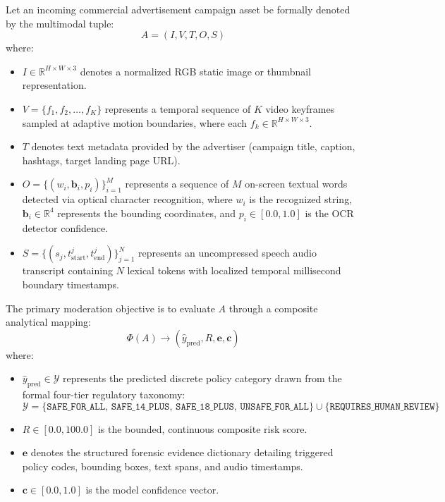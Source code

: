 \documentclass[12pt,a4paper]{report}
\begin{document}
Let an incoming commercial advertisement campaign asset be formally denoted by the multimodal tuple:
\begin{equation}
A = \left( I, V, T, O, S \right)
\end{equation}
where:
\begin{itemize}
    \item $I \in \mathbb{R}^{H \times W \times 3}$ denotes a normalized RGB static image or thumbnail representation.
    \item $V = \{f_1, f_2, \dots, f_K\}$ represents a temporal sequence of $K$ video keyframes sampled at adaptive motion boundaries, where each $f_k \in \mathbb{R}^{H \times W \times 3}$.
    \item $T$ denotes text metadata provided by the advertiser (campaign title, caption, hashtags, target landing page URL).
    \item $O = \{(w_i, \mathbf{b}_i, p_i)\}_{i=1}^M$ represents a sequence of $M$ on-screen textual words detected via optical character recognition, where $w_i$ is the recognized string, $\mathbf{b}_i \in \mathbb{R}^4$ represents the bounding coordinates, and $p_i \in [0.0, 1.0]$ is the OCR detector confidence.
    \item $S = \{(s_j, t_{\text{start}}^j, t_{\text{end}}^j)\}_{j=1}^N$ represents an uncompressed speech audio transcript containing $N$ lexical tokens with localized temporal millisecond boundary timestamps.
\end{itemize}

The primary moderation objective is to evaluate $A$ through a composite analytical mapping:
\begin{equation}
\Phi(A) \longrightarrow \left( \hat{y}_{\text{pred}}, R, \mathbf{e}, \mathbf{c} \right)
\end{equation}
where:
\begin{itemize}
    \item $\hat{y}_{\text{pred}} \in \mathcal{Y}$ represents the predicted discrete policy category drawn from the formal four-tier regulatory taxonomy:
    \begin{equation}
    \mathcal{Y} = \{\texttt{SAFE\_FOR\_ALL},\, \texttt{SAFE\_14\_PLUS},\, \texttt{SAFE\_18\_PLUS},\, \texttt{UNSAFE\_FOR\_ALL}\} \cup \{\texttt{REQUIRES\_HUMAN\_REVIEW}\}
    \end{equation}
    \item $R \in [0.0, 100.0]$ is the bounded, continuous composite risk score.
    \item $\mathbf{e}$ denotes the structured forensic evidence dictionary detailing triggered policy codes, bounding boxes, text spans, and audio timestamps.
    \item $\mathbf{c} \in [0.0, 1.0]$ is the model confidence vector.
\end{itemize}
\end{document}
